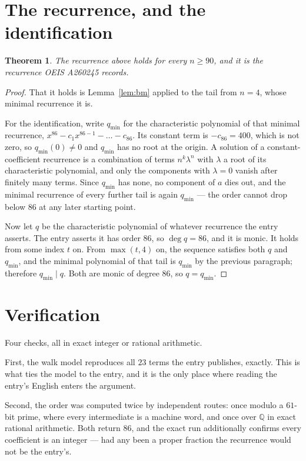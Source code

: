 \documentclass[11pt,a4paper]{article}
\theoremstyle{plain}
\newtheorem{theorem}{Theorem}
\theoremstyle{definition}
\begin{document}
\section{The recurrence, and the identification}

\begin{theorem}
The recurrence above holds for every $n\ge90$, and it is the recurrence OEIS A260245 records.
\end{theorem}

\begin{proof}
That it holds is Lemma~\ref{lem:bm} applied to the tail from $n=4$, whose minimal
recurrence it is.

For the identification, write $q_{\min}$ for the characteristic polynomial of that minimal
recurrence, $x^{86}-c_1x^{86-1}-\dots-c_{86}$. Its constant term is
$-c_{86}=400$, which is not zero, so $q_{\min}(0)\neq0$ and $q_{\min}$ has no
root at the origin. A solution of a constant-coefficient recurrence is a combination of terms
$n^{k}\lambda^{n}$ with $\lambda$ a root of its characteristic polynomial, and only the
components with $\lambda=0$ vanish after finitely many terms. Since $q_{\min}$ has none, no
component of $a$ dies out, and the minimal recurrence of every further tail is again
$q_{\min}$ --- the order cannot drop below $86$ at any later starting point.

Now let $q$ be the characteristic polynomial of whatever recurrence the entry asserts. The
entry asserts it has order $86$, so $\deg q=86$, and it is monic. It holds from some
index $t$ on. From $\max(t,4)$ on, the sequence satisfies both $q$ and $q_{\min}$, and
the minimal polynomial of that tail is $q_{\min}$ by the previous paragraph; therefore
$q_{\min}\mid q$. Both are monic of degree $86$, so $q=q_{\min}$.
\end{proof}

\section{Verification}

Four checks, all in exact integer or rational arithmetic.

First, the walk model reproduces all $23$ terms the entry publishes, exactly. This is
what ties the model to the entry, and it is the only place where reading the entry's English
enters the argument.

Second, the order was computed twice by independent routes: once modulo a $61$-bit prime, where
every intermediate is a machine word, and once over $\mathbb{Q}$ in exact rational arithmetic.
Both return $86$, and the exact run additionally confirms every coefficient is an integer
--- had any been a proper fraction the recurrence would not be the entry's.
\end{document}
